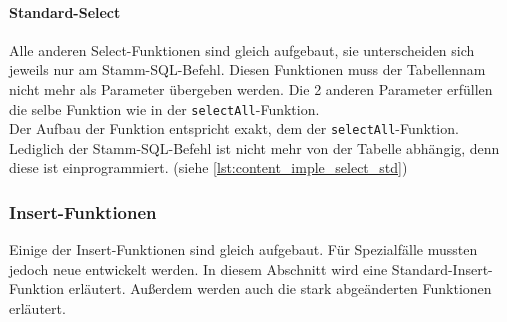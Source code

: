 

\paragraph{Standard-Select\\}
Alle anderen Select-Funktionen sind gleich aufgebaut, sie unterscheiden sich jeweils nur am Stamm-SQL-Befehl. Diesen Funktionen muss der Tabellennam nicht mehr als Parameter übergeben werden. Die 2 anderen Parameter erfüllen die selbe Funktion wie in der \texttt{selectAll}-Funktion.\\
Der Aufbau der Funktion entspricht exakt, dem der \texttt{selectAll}-Funktion. Lediglich der Stamm-SQL-Befehl ist nicht mehr von der Tabelle abhängig, denn diese ist einprogrammiert. (siehe \autoref{lst:content_imple_select_std})



\subsubsection{Insert-Funktionen}
Einige der Insert-Funktionen sind gleich aufgebaut. Für Spezialfälle mussten jedoch neue entwickelt werden. In diesem Abschnitt wird eine Standard-Insert-Funktion erläutert. Außerdem werden auch die stark abgeänderten Funktionen erläutert.

